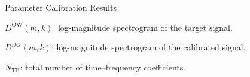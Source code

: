 \documentclass[aspectratio=169,10pt]{beamer}
\begin{document}
\begin{frame}{Parameter Calibration Results}
{\begin{minipage}[c]{0.52\linewidth}
\end{minipage}
\hfill
\begin{minipage}[c]{0.43\linewidth}

    \scriptsize

    $D^{\mathrm{OW}}(m,k)$:
    log-magnitude spectrogram of the target signal.

    \vspace{0.12cm}

    $D^{\mathrm{DG}}(m,k)$:
    log-magnitude spectrogram of the calibrated signal.

    \vspace{0.12cm}

    $N_{\mathrm{TF}}$:
    total number of time--frequency coefficients.

\end{minipage}
}
\end{frame}
\end{document}

